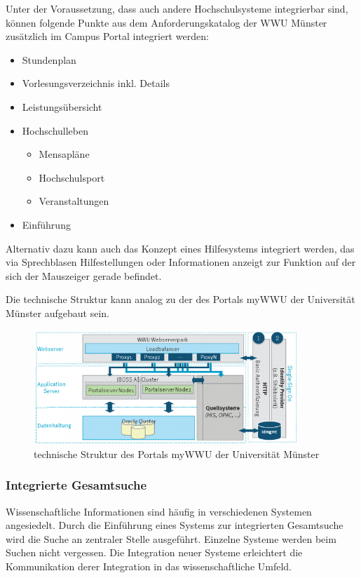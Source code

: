 Unter der Voraussetzung, dass auch andere Hochschulsysteme integrierbar sind, können folgende Punkte aus dem Anforderungskatalog der WWU Münster zusätzlich im Campus Portal integriert werden:

\begin{itemize}
	\item Stundenplan
	\item Vorlesungsverzeichnis inkl. Details
	\item Leistungsübersicht
	\item Hochschulleben
	\begin{itemize}
		\item Mensapläne
		\item Hochschulsport
		\item Veranstaltungen
	\end{itemize}
	\item Einführung
\end{itemize}

Alternativ dazu kann auch das Konzept eines Hilfesystems integriert werden, das via Sprechblasen Hilfestellungen oder Informationen anzeigt zur Funktion auf der sich der Mauszeiger gerade befindet.

Die technische Struktur kann analog zu der des Portals myWWU der Universität Münster aufgebaut sein.
\begin{figure}[h!]
	\centering
	\includegraphics[width=10cm]{kapitel/gruppe3/bilder/struktur_mywwu}
	\caption{technische Struktur des Portals myWWU der Universität Münster}
	\label{fig_struktur_mywwu}
\end{figure}

\subsubsection{Integrierte Gesamtsuche}
Wissenschaftliche Informationen sind häufig in verschiedenen Systemen angesiedelt. Durch die Einführung eines Systems zur integrierten Gesamtsuche wird die Suche an zentraler Stelle ausgeführt. Einzelne Systeme werden beim Suchen nicht vergessen. Die Integration neuer Systeme erleichtert die Kommunikation derer Integration in das wissenschaftliche Umfeld.

